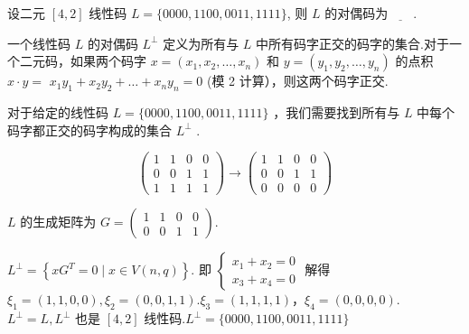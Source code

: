 \newpage
 \begin{tcolorbox}[breakable,colback=blue!5!white,colframe=blue!75!black,
 title= 填空题]

设二元 $ [4,2] $ 线性码 $ L=\{0000,1100,0011,1111\} $, 则 $ L $ 的对偶码为$\underline{\hspace{2em}}$.
\tcblower

一个线性码 $ L $ 的对偶码 $ L^{\perp} $ 定义为所有与 $ L $ 中所有码字正交的码字的集合.对于一个二元码，如果两个码字 $ x=\left(x_{1}, x_{2}, \ldots, x_{n}\right) $ 和 $ y=\left(y_{1}, y_{2}, \ldots, y_{n}\right) $ 的点积 $ x \cdot y= $ $ x_{1} y_{1}+x_{2} y_{2}+\ldots+x_{n} y_{n}=0 $ (模 2 计算），则这两个码字正交.

对于给定的线性码 $ L=\{0000,1100,0011,1111\} $ ，我们需要找到所有与 $ L $ 中每个码字都正交的码字构成的集合 $ L^{\perp} $ .  

$$
\left(\begin{array}{llll}
1 & 1 & 0&0 \\
0&0 & 1 & 1 \\
1 & 1 & 1&1
\end{array}\right) \rightarrow\left(\begin{array}{llll}
1 & 1 & 0&0 \\
0&0 & 1 & 1 \\
0 & 0 &0&0
\end{array}\right)
$$

$ L $ 的生成矩阵为 $ G=\left(\begin{array}{llll}1 & 1 & 0 & 0 \\ 0 & 0 & 1 & 1\end{array}\right) $.

 $ L^{\perp}=\left\{x G^{T}=0 \mid x \in V(n, q)\right\} $. 即 $ \left\{\begin{array}{l}x_{1}+x_{2}=0 \\ x_{3}+x_{4}=0\end{array}\right. $ 解得 $ \xi_{1}=(1,1,0,0), \xi_{2}=(0,0,1,1) $.$ \xi_{3}=(1,1,1,1)， \xi_{4}=(0,0,0,0)$. $ L^{\perp}=L, L^{\perp} $ 也是 $ [4,2] $ 线性码.$ L^{\perp}=\{0000,1100,0011,1111\} $
 \end{tcolorbox}


